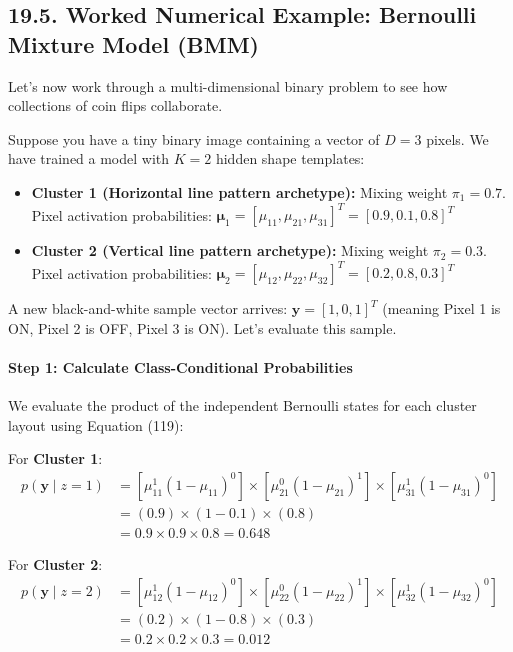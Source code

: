 \documentclass{article}
\begin{document}
\subsection*{19.5. Worked Numerical Example: Bernoulli Mixture Model (BMM)}

Let's now work through a multi-dimensional binary problem to see how collections of coin flips collaborate.

Suppose you have a tiny binary image containing a vector of $D=3$ pixels. We have trained a model with $K=2$ hidden shape templates:
\begin{itemize}
    \item \textbf{Cluster 1 (Horizontal line pattern archetype):} Mixing weight $\pi_1 = 0.7$. \\ Pixel activation probabilities: $\boldsymbol{\mu}_1 = [\mu_{11}, \mu_{21}, \mu_{31}]^T = [0.9, 0.1, 0.8]^T$
    \item \textbf{Cluster 2 (Vertical line pattern archetype):} Mixing weight $\pi_2 = 0.3$. \\ Pixel activation probabilities: $\boldsymbol{\mu}_2 = [\mu_{12}, \mu_{22}, \mu_{32}]^T = [0.2, 0.8, 0.3]^T$
\end{itemize}

A new black-and-white sample vector arrives: $\mathbf{y} = [1, 0, 1]^T$ (meaning Pixel 1 is ON, Pixel 2 is OFF, Pixel 3 is ON). Let's evaluate this sample.

\paragraph{Step 1: Calculate Class-Conditional Probabilities}
We evaluate the product of the independent Bernoulli states for each cluster layout using Equation (119):

For \textbf{Cluster 1}:
\begin{align}
p(\mathbf{y} \mid z=1) &= \left[\mu_{11}^1 (1-\mu_{11})^0\right] \times \left[\mu_{21}^0 (1-\mu_{21})^1\right] \times \left[\mu_{31}^1 (1-\mu_{31})^0\right] \nonumber \\
&= (0.9) \times (1 - 0.1) \times (0.8) \nonumber \\
&= 0.9 \times 0.9 \times 0.8 = \mathbf{0.648} \tag{126}
\end{align}

For \textbf{Cluster 2}:
\begin{align}
p(\mathbf{y} \mid z=2) &= \left[\mu_{12}^1 (1-\mu_{12})^0\right] \times \left[\mu_{22}^0 (1-\mu_{22})^1\right] \times \left[\mu_{32}^1 (1-\mu_{32})^0\right] \nonumber \\
&= (0.2) \times (1 - 0.8) \times (0.3) \nonumber \\
&= 0.2 \times 0.2 \times 0.3 = \mathbf{0.012} \tag{127}
\end{align}
\end{document}
